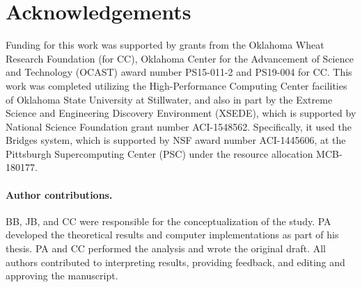\documentclass[12pt, a4paper, bibliography=totoc]{scrartcl}
\newcommand{\bb}[1]{{\color{purple} #1}}
\begin{document}

\section*{Acknowledgements}\label{sec:thanks}

Funding for this work was supported by grants from the Oklahoma Wheat Research Foundation (for CC), Oklahoma Center for the Advancement of Science and Technology (OCAST) award number PS15-011-2 and PS19-004 for CC. This work was completed utilizing the High-Performance Computing Center facilities of Oklahoma State University at Stillwater, and also in part by the Extreme Science and Engineering Discovery Environment (XSEDE), which is supported by National Science Foundation grant number ACI-1548562. Specifically, it used the Bridges system, which is supported by NSF award number ACI-1445606, at the Pittsburgh Supercomputing Center (PSC) under the resource allocation MCB-180177. 

\paragraph{Author contributions.} 
BB, JB, and CC were responsible for the conceptualization of the study. PA developed the theoretical results and computer implementations as part of his thesis. PA and CC performed the analysis and wrote the original draft. All authors contributed to interpreting results, providing feedback, and editing and approving the manuscript. 
\end{document}
